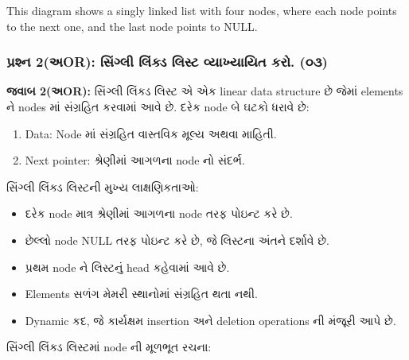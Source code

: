 This diagram shows a singly linked list with four nodes, where each node
points to the next one, and the last node points to NULL.

\hypertarget{uxaaauxab0uxab6uxaa8-2uxa85or-uxab8uxa97uxab2-uxab2uxa95uxaa1-uxab2uxab8uxa9f-uxab5uxaafuxa96uxaafuxaafuxaa4-uxa95uxab0.-uxae6uxae9}{%
\subsubsection{પ્રશ્ન 2(અOR): સિંગ્લી લિંક્ડ લિસ્ટ વ્યાખ્યાયિત કરો.
(૦૩)}\label{uxaaauxab0uxab6uxaa8-2uxa85or-uxab8uxa97uxab2-uxab2uxa95uxaa1-uxab2uxab8uxa9f-uxab5uxaafuxa96uxaafuxaafuxaa4-uxa95uxab0.-uxae6uxae9}}

\textbf{જવાબ 2(અOR):} સિંગ્લી લિંક્ડ લિસ્ટ એ એક linear data structure છે જેમાં
elements ને nodes માં સંગ્રહિત કરવામાં આવે છે. દરેક node બે ઘટકો ધરાવે છે:

\begin{enumerate}
\def\labelenumi{\arabic{enumi}.}
\tightlist
\item
  Data: Node માં સંગ્રહિત વાસ્તવિક મૂલ્ય અથવા માહિતી.
\item
  Next pointer: શ્રેણીમાં આગળના node નો સંદર્ભ.
\end{enumerate}

સિંગ્લી લિંક્ડ લિસ્ટની મુખ્ય લાક્ષણિકતાઓ:

\begin{itemize}
\tightlist
\item
  દરેક node માત્ર શ્રેણીમાં આગળના node તરફ પોઇન્ટ કરે છે.
\item
  છેલ્લો node NULL તરફ પોઇન્ટ કરે છે, જે લિસ્ટના અંતને દર્શાવે છે.
\item
  પ્રથમ node ને લિસ્ટનું head કહેવામાં આવે છે.
\item
  Elements સળંગ મેમરી સ્થાનોમાં સંગ્રહિત થતા નથી.
\item
  Dynamic કદ, જે કાર્યક્ષમ insertion અને deletion operations ની મંજૂરી આપે છે.
\end{itemize}

સિંગ્લી લિંક્ડ લિસ્ટમાં node ની મૂળભૂત રચના:

\begin{Shaded}
\begin{Highlighting}[]
     \NormalTok{(}
        \OperatorTok{=}
         \OperatorTok{=} 
\end{Highlighting}
\end{Shaded}

